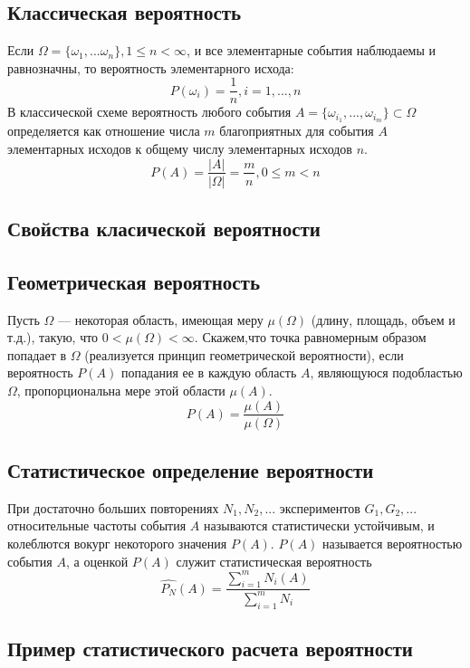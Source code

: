 \documentclass[12pt]{article}
\begin{document}
\subsection{Классическая вероятность}
Если $\Omega = \{\omega_1, ... \omega_n\}, 1 \leq n < \infty$,
и все элементарные события наблюдаемы и равнозначны,
то вероятность элементарного исхода:
\[P(\omega_i) = \frac{1}{n}, i = 1, ..., n\]
В классической схеме вероятность любого события
$A = \{\omega_{i_1}, ..., \omega_{i_m}\} \subset \Omega$ определяется
как отношение числа $m$ благоприятных для события $A$ элементарных исходов
к общему числу элементарных исходов $n$. \\
\[P(A) = \frac{|A|}{|\Omega|} = \frac{m}{n}, 0 \leq m < n\]

\subsection{Свойства класической вероятности}

\subsection{Геометрическая вероятность}
Пусть $\Omega$ --- некоторая область, имеющая меру $\mu(\Omega)$ (длину, площадь, объем и т.д.), такую,
что $0 < \mu(\Omega) < \infty$.
Скажем,что точка равномерным образом попадает в $\Omega$ (реализуется принцип геометрической вероятности),
если вероятность $P(A)$ попадания ее в каждую область $A$, являющуюся подобластью $\Omega$,
пропорциональна мере этой области $\mu(A)$. \\
\[P(A) = \frac{\mu(A)}{\mu(\Omega)}\]

\subsection{Статистическое определение вероятности}
При достаточно больших повторениях $N_1, N_2, ...$ экспериментов $G_1, G_2, ...$ относительные
частоты события $A$ называются статистически устойчивым, и колеблются вокург некоторого значения $P(A)$.
$P(A)$ называется вероятностью события $A$, а оценкой $P(A)$ служит статистическая вероятность
\[\widehat{P_N}(A) = \frac{\sum^m_{i=1}N_i(A)}{\sum^m_{i=1}N_i}\]

\subsection{Пример статистического расчета вероятности}
\end{document}
